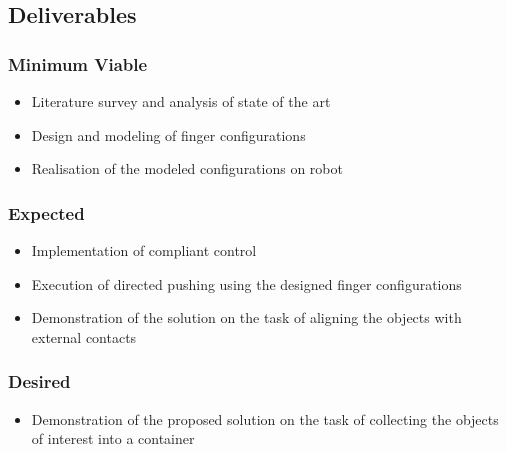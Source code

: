 \documentclass[rnd]{mas_proposal}
\begin{document}
\subsection{Deliverables}
\subsubsection*{Minimum Viable}

\begin{itemize}
    \item Literature survey and analysis of state of the art
    \item Design and modeling of finger configurations
    \item Realisation of the modeled configurations on robot 
\end{itemize}

\subsubsection*{Expected}
\begin{itemize}
	\item Implementation of compliant control
    \item Execution of directed pushing using the designed finger configurations
    \item  Demonstration of the solution on the task of aligning the objects with external contacts
\end{itemize}

 
\subsubsection*{Desired}
\begin{itemize}
   \item Demonstration of the proposed solution on the task of collecting the objects of interest into a container
\end{itemize}


\nocite{*}
\newpage
\end{document}
